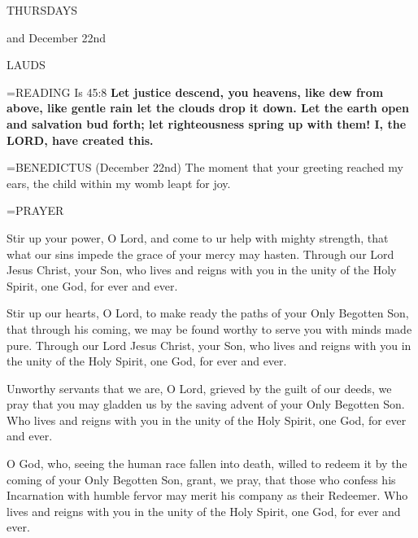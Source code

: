 \begin{center}
\normalsize \begin{center}\normalsize THURSDAYS\\
\end{center}
\footnotesize and December 22nd\\
\end{center}

\begin{flushleft}\normalsize LAUDS\\\end{flushleft}

\hangindent=\parindent \small{READING} Is 45:8 \textbf{Let justice descend, you heavens, like dew from above, like gentle rain let the clouds drop it down. Let the earth open and salvation bud forth; let righteousness spring up with them! I, the LORD, have created this.\\}

\hangindent=\parindent \small{BENEDICTUS  (December 22nd) The moment that your greeting reached my ears, the child within my womb leapt for joy. \\}


\hangindent=\parindent \small PRAYER
\begin{description}[labelindent=\parindent, noitemsep, leftmargin=*]
\item [Week 1:]  Stir up your power, O Lord, and come to ur help with mighty strength, that what our sins impede the grace of your mercy may hasten. Through our Lord Jesus Christ, your Son, who lives and reigns with you in the unity of the Holy Spirit, one God, for ever and ever.
\item [Week 2:]  Stir up our hearts, O Lord, to make ready the paths of your Only Begotten Son, that through his coming, we may be found worthy to serve you with minds made pure. Through our Lord Jesus Christ, your Son, who lives and reigns with you in the unity of the Holy Spirit, one God, for ever and ever.
\item [Week 3:]  Unworthy servants that we are, O Lord, grieved by the guilt of our deeds, we pray that you may gladden us by the saving advent of your Only Begotten Son. Who lives and reigns with you in the unity of the Holy Spirit, one God, for ever and ever.
\item [December 22nd:]  O God, who, seeing the human race fallen into death, willed to redeem it by the coming of your Only Begotten Son, grant, we pray, that those who confess his Incarnation with humble fervor may merit his company as their Redeemer. Who lives and reigns with you in the unity of the Holy Spirit, one God, for ever and ever.
\end{description}

